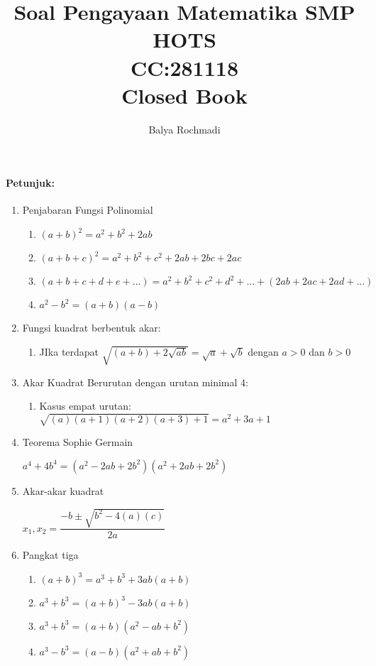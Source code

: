 \documentclass[12pt,a4paper,draft,final,oneside,twoside,openright,openany]{article}
\author{Balya Rochmadi}
\title{Soal Pengayaan Matematika SMP HOTS \\CC:281118 \\
	Closed Book}
\begin{document}
		\maketitle
		\Large
		\noindent\makebox[\linewidth]{\rule{\paperwidth}{0.4pt}}
		\paragraph{Petunjuk:}
		\begin{enumerate}
			\item Penjabaran Fungsi Polinomial
			\begin{enumerate}
				\item $(a+b)^2=a^2+b^2+2ab$
				\item $(a+b+c)^2=a^2+b^2+c^2+2ab+2bc+2ac$
				\item $(a+b+c+d+e+...)=a^2+b^2+c^2+d^2+...+(2ab+2ac+2ad+...)$
				\item $a^2-b^2=(a+b)(a-b)$
			\end{enumerate}	
			\item Fungsi kuadrat berbentuk akar:
			\begin{enumerate}
				\item JIka terdapat $\sqrt{(a+b)+2\sqrt{ab}}=\sqrt{a}+\sqrt{b}$ dengan $a>0$ dan $b>0$
			\end{enumerate}
			\item Akar Kuadrat Berurutan dengan urutan minimal 4:
			\begin{enumerate}
				\item Kasus empat urutan:
				$\sqrt{(a)(a+1)(a+2)(a+3)+1}=a^2+3a+1$
			\end{enumerate}
			\item Teorema Sophie Germain 
			\begin{center}
				$a^4+4b^4=(a^2-2ab+2b^2)(a^2+2ab+2b^2)$
			\end{center}
			\item Akar-akar kuadrat
			\begin{center}
				$x_1,x_2=\dfrac{-b \pm \sqrt{b^2-4(a)(c)}}{2a}$
			\end{center}
			\item Pangkat tiga
				\begin{enumerate}
					\item $(a+b)^3=a^3+b^3+3ab(a+b)$
					\item $a^3+b^3=(a+b)^3-3ab(a+b)$
					\item $a^3+b^3=(a+b)(a^2-ab+b^2)$
					\item $a^3-b^3=(a-b)(a^2+ab+b^2)$
				\end{enumerate}
\noindent\makebox[\linewidth]{\rule{\paperwidth}{0.4pt}}
		
		\end{enumerate}
\end{document}
